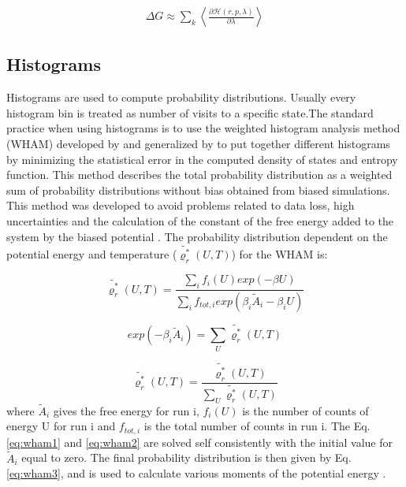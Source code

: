 \begin{equation}
\label{eq:ti4}
\begin{aligned}
\Delta G \approx \sum _{k}  \left \langle \frac{\partial \mathcal{H}(r,p,\lambda)}{\partial \lambda} \right \rangle 
\end{aligned}
\end{equation}

\subsection{Histograms}
Histograms are used  to compute probability distributions. Usually every histogram bin is treated as number of visits to a specific state.The standard practice when using histograms is to use the weighted histogram analysis method (WHAM) developed by  and generalized by  \cite{freeenergy} to put together different histograms by minimizing the statistical error in the computed density of states and entropy function. This method describes the total probability distribution as a weighted sum of probability distributions without bias  obtained from biased simulations. This method was developed to avoid problems related to data loss, high uncertainties and the calculation of the constant of the free energy added to the system by the biased potential \cite{ROUX1995275}. The probability distribution dependent on the potential energy and temperature ($\tilde{\varrho_{r}^{*}}(U,T)$) for the WHAM is:

\begin{equation}
\label{eq:wham1}
\tilde{\varrho_{r}^{*}}(U,T) = \frac{\sum_{i} f_{i}(U) exp(- \beta U)}{\sum_{i} f_{tot,i} exp(\beta _{i} \tilde{A}_{i} -\beta _{i} U) }
\end{equation} 

\begin{equation}
\label{eq:wham2}
exp(- \beta _{i} \tilde{A}_{i}) = \sum_{U} \tilde{\varrho_{r}^{*}}(U,T) 
\end{equation}

\begin{equation}
\label{eq:wham3}
\tilde{\varrho_{r}^{*}}(U,T) = \frac{\tilde{\varrho_{r}^{*}}(U,T)}{\sum_{U} \tilde{\varrho_{r}^{*}}(U,T)}
\end{equation} 
where $\tilde{A}_{i}$ gives the free energy for run i, $f_{i}(U)$ is the number of counts of energy U for run i and $f_{tot,i}$ is the total number of counts in run i. The Eq. \eqref{eq:wham1} and \eqref{eq:wham2} are solved self consistently with the initial value for $\tilde{A}_{i}$ equal to zero. The final probability distribution is then given by Eq. \eqref{eq:wham3}, and is used to calculate various moments of the potential energy \cite{freeenergy}.



